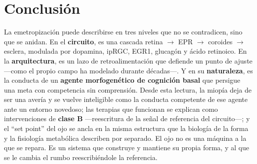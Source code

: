 \documentclass[11pt,a4paper]{article}
\begin{document}
\section{Conclusión}

La emetropización puede describirse en tres niveles que no se contradicen, sino que se anidan. En el \textbf{circuito}, es una cascada retina $\rightarrow$ EPR $\rightarrow$ coroides $\rightarrow$ esclera, modulada por dopamina, ipRGC, EGR1, glucagón y ácido retinoico. En la \textbf{arquitectura}, es un lazo de retroalimentación que defiende un punto de ajuste ---como el propio campo ha modelado durante décadas---. Y en su \textbf{naturaleza}, es la conducta de un \textbf{agente morfogenético de cognición basal} que persigue una meta con competencia sin comprensión. Desde esta lectura, la miopía deja de ser una avería y se vuelve inteligible como la conducta competente de ese agente ante un entorno novedoso; las terapias que funcionan se explican como intervenciones de \textbf{clase B} ---reescritura de la señal de referencia del circuito---; y el \enquote{set point} del ojo se ancla en la misma estructura que la biología de la forma y la fisiología metabólica describen por separado. El ojo no es una máquina a la que se repara. Es un sistema que construye y mantiene su propia forma, y al que se le cambia el rumbo reescribiéndole la referencia.
\end{document}
